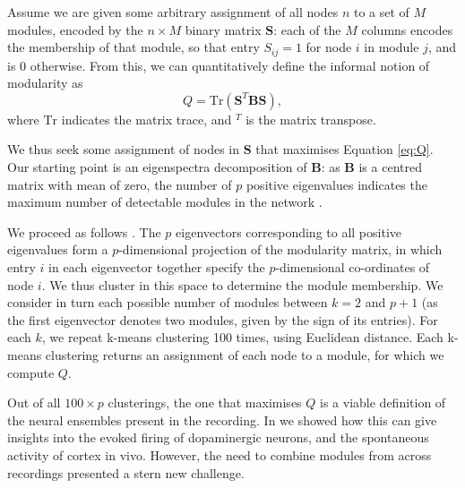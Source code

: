 \documentclass[11pt,a4paper]{article}
\begin{document}
Assume we are given some arbitrary assignment of all nodes $n$ to a set of $M$ modules, encoded by the $ n \times M$ binary matrix $\mathbf{S}$: each of the $M$ columns encodes the membership of that module, so that entry $S_{ij} = 1$ for node $i$ in module $j$, and is 0 otherwise. From this, we can quantitatively define the informal notion of modularity as \citep{Newman2006a}
\begin{equation}\label{eq:Q}
Q = \mathrm{Tr}(\mathbf{S}^{T}\mathbf{B}\mathbf{S}),
\end{equation}
where $\mathrm{Tr}$ indicates the matrix trace, and $^T$ is the matrix transpose.

We thus seek some assignment of nodes in $\mathbf{S}$ that maximises Equation \ref{eq:Q}. Our starting point is an eigenspectra decomposition of $\mathbf{B}$: as $\mathbf{B}$ is a centred matrix with mean of zero, the number of $p$ positive eigenvalues indicates the maximum number of detectable modules in the network \citep{Newman2006a}.

We proceed as follows \citep{Humphries2011}. The $p$ eigenvectors corresponding to all positive eigenvalues form a $p$-dimensional projection of the modularity matrix, in which entry $i$ in each eigenvector together specify the $p$-dimensional co-ordinates of node $i$. We thus cluster in this space to determine the module membership. We consider in turn each possible number of modules between $k=2$ and $p+1$ (as the first eigenvector denotes two modules, given by the sign of its entries). For each $k$, we repeat k-means clustering 100 times, using Euclidean distance. Each k-means clustering returns an assignment of each node to a module, for which we compute $Q$.

Out of all $100 \times p$ clusterings, the one that maximises $Q$ is a viable definition of the neural ensembles present in the recording. In \citep{Humphries2011} we showed how this can give insights into the evoked firing of dopaminergic neurons, and the spontaneous activity of cortex in vivo. However, the need to combine modules from across recordings presented a stern new challenge.
\end{document}
